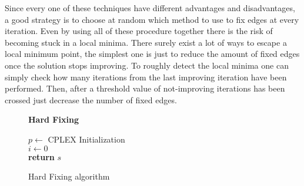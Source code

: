 Since every one of these techniques have different advantages and disadvantages, a good strategy is to choose at random which method to use to fix edges at every iteration.
Even by using all of these procedure together there is the risk of becoming stuck in a local minima.
There surely exist a lot of ways to escape a local minimum point, the simplest one is just to reduce the amount of fixed edges once the solution stops improving.
To roughly detect the local minima one can simply check how many iterations from the last improving iteration have been performed.
Then, after a threshold value of not-improving iterations has been crossed just decrease the number of fixed edges.
\begin{figure}[htbp]
	\textbf{Hard Fixing} \\
	\begin{algorithm}[H]
		\vspace{2mm}
        $p \gets$ CPLEX Initialization \\
        $i \gets 0$ \\ 
        \textbf{return} $s$
	\end{algorithm}
	\caption{Hard Fixing algorithm} \label{fig:hardfix}
\end{figure}

